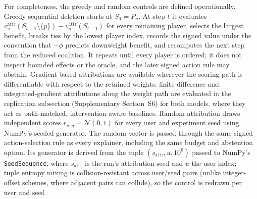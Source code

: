 \documentclass[manuscript,screen,review,anonymous]{acmart}
\begin{document}
For completeness, the greedy and random controls are defined operationally. Greedy sequential deletion starts at $S_0=P_u$. At step $t$ it evaluates $v_u^{\mathrm{attr}}(S_{t-1}\setminus\{p\})-v_u^{\mathrm{attr}}(S_{t-1})$ for every remaining player, selects the largest benefit, breaks ties by the lowest player index, records the signed value under the convention that $-\phi$ predicts downweight benefit, and recomputes the next step from the reduced coalition. It repeats until every player is ordered; it does not inspect bounded effects or the oracle, and the later signed action rule may abstain. Gradient-based attributions are available wherever the scoring path is differentiable with respect to the retained weights: finite-difference and integrated-gradient attributions along the weight path are evaluated in the replication subsection (Supplementary Section~S6) for both models, where they act as path-matched, intervention-aware baselines. Random attribution draws independent scores $r_{u,p}\sim\mathcal{N}(0,1)$ for every user and experiment seed using NumPy's seeded generator. The random vector is passed through the same signed action-selection rule as every explainer, including the same budget and abstention option. Its generator is derived from the tuple $(s_{\mathrm{attr}},u,10^6)$ passed to NumPy's \texttt{SeedSequence}, where $s_{\mathrm{attr}}$ is the run's attribution seed and $u$ the user index; tuple entropy mixing is collision-resistant across user/seed pairs (unlike integer-offset schemes, where adjacent pairs can collide), so the control is redrawn per user and seed.
\end{document}
